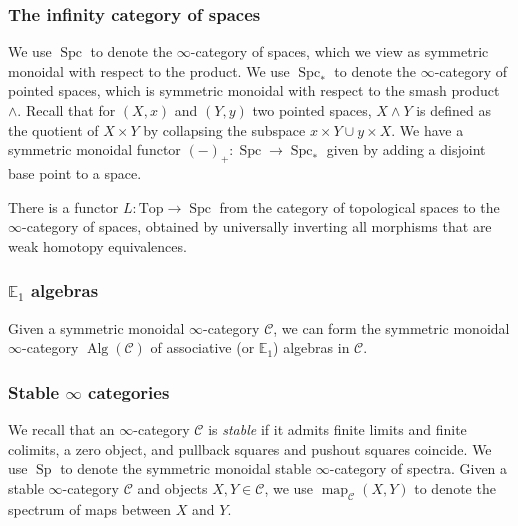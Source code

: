 \documentclass[12 pt]{amsart}
\theoremstyle{plain}
\theoremstyle{definition}
\theoremstyle{remark}
\numberwithin{equation}{section}
\newcommand \cC{{\mathcal C}}
\newcommand \cD{{\mathcal D}}
\DeclareMathOperator\op{op}
\DeclareMathOperator\Alg{Alg}
\DeclareMathOperator\Sp{Sp}
\DeclareMathOperator\Spc{Spc}
\DeclareMathOperator\CAlg{CAlg}
\DeclareMathOperator\coAlg{coAlg}
\DeclareMathOperator\coCAlg{coCAlg}
\DeclareMathOperator\map{map}
\newcommand\Top{\mathrm{Top}}
\newcommand\EE{\mathbb{E}}
\begin{document}
\subsubsection{The infinity category of spaces}
\label{subsubsection:spaces}
We use $\Spc$ to denote the $\infty$-category of spaces, which we view as symmetric monoidal with respect to the product. We use $\Spc_*$ to denote the $\infty$-category of pointed spaces, which is symmetric monoidal with respect to the smash product $\wedge$. Recall that for $(X,x)$ and $(Y,y)$ two pointed spaces, $X \wedge Y$ is defined as the quotient of $X \times Y$ by collapsing the subspace
$x \times Y \cup y \times X$. We have a symmetric monoidal functor $(-)_+:\Spc \to \Spc_*$ given by adding a disjoint base point to a space.

There is a functor $L:\Top \to \Spc$ from the category of topological spaces to the $\infty$-category of spaces, obtained by universally inverting all morphisms that are weak homotopy equivalences.

\subsubsection{$\EE_1$ algebras}
Given a symmetric monoidal $\infty$-category $\cC$, we can form the symmetric
monoidal $\infty$-category $\Alg(\cC)$
of associative (or $\EE_1$) 
algebras in $\cC$. %

\subsubsection{Stable $\infty$ categories}
We recall that an $\infty$-category $\cC$ is {\em stable} if it admits finite limits and finite colimits, a zero object, and pullback squares and pushout squares coincide. 
We use $\Sp$ to denote the symmetric monoidal stable $\infty$-category of spectra. Given a stable $\infty$-category $\cC$ and objects $X,Y \in \cC$, we use $\map_{\cC}(X,Y)$ to denote the spectrum of maps between $X$ and $Y$.%
\end{document}
